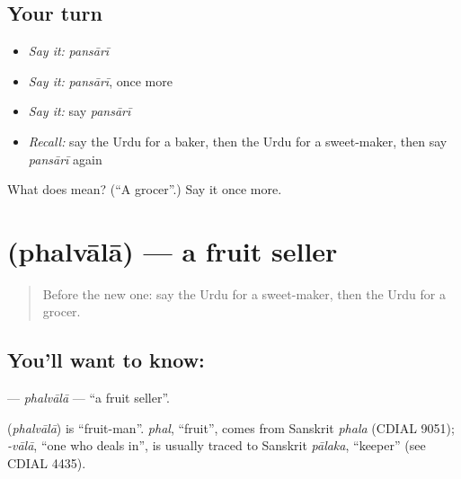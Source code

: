 \subsection*{Your turn}
\begin{itemize}
\raggedright
  \item \emph{Say it:} \emph{pansārī}
  \item \emph{Say it:} \emph{pansārī}, once more
  \item \emph{Say it:} say \emph{pansārī}
  \item \emph{Recall:} say the Urdu for a baker, then the Urdu for a sweet-maker, then say \emph{pansārī} again
\end{itemize}

\begin{tcolorbox}[breakable,colback=teal!4,colframe=teal!35!black,title={Before you move on}]
What does  mean? (\textquotedblleft{}A grocer\textquotedblright{}.) Say it once more.
\end{tcolorbox}
\section[\texorpdfstring{\ur{پھل} \ur{والا} (phalvālā)}{پھل والا (phalvālā)}]{  (phalvālā) — a fruit seller}

\label{lesson:UR-C263-phalvala}



\begin{quote}
Before the new one: say the Urdu for a sweet-maker, then the Urdu for a grocer.
\end{quote}

\subsection*{You'll want to know:  }
\textbf{ } — \emph{phalvālā} — \textquotedblleft{}a fruit seller\textquotedblright{}.

\begin{cousinweb}
\textbf{ } (\emph{phalvālā}) is \textquotedblleft{}fruit-man\textquotedblright{}. \emph{phal}, \textquotedblleft{}fruit\textquotedblright{}, comes from Sanskrit \emph{phala} (CDIAL 9051); \emph{-vālā}, \textquotedblleft{}one who deals in\textquotedblright{}, is usually traced to Sanskrit \emph{pālaka}, \textquotedblleft{}keeper\textquotedblright{} (see CDIAL 4435).
\end{cousinweb}

